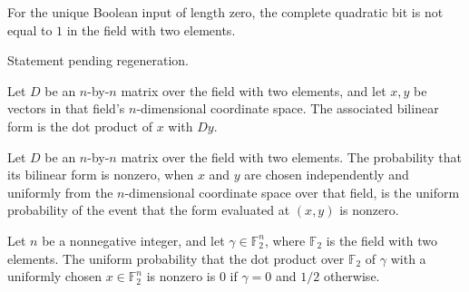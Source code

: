 \begin{theorem}
\label{FABL.not_isCompleteQuadraticOne_zero}
\leanok
{}
For the unique Boolean input of length zero, the complete quadratic bit is not equal to
$1$ in the field with two elements.
\end{theorem}

\begin{theorem}
\label{FABL.completeQuadraticLinearPCPPDescription_or_zero}
\leanok
{}
Statement pending regeneration.
\end{theorem}

\begin{definition}
\label{FABL.matrixBilinearForm}
\leanok
{}
Let $D$ be an $n$-by-$n$ matrix over the field with two elements, and let $x,y$ be
vectors in that field's $n$-dimensional coordinate space. The associated bilinear form
is the dot product of $x$ with $Dy$.
\end{definition}

\begin{definition}
\label{FABL.matrixBilinearNonzeroProbability}
\leanok
{}
Let $D$ be an $n$-by-$n$ matrix over the field with two elements. The probability that
its bilinear form is nonzero, when $x$ and $y$ are chosen independently and uniformly
from the $n$-dimensional coordinate space over that field, is the uniform probability of
the event that the form evaluated at $(x,y)$ is nonzero.
\end{definition}

\begin{theorem}
\leanok
{}
Let $n$ be a nonnegative integer, and let $\gamma\in\mathbb{F}_2^n$, where
$\mathbb{F}_2$ is the field with two elements. The uniform probability that the dot
product over $\mathbb{F}_2$ of $\gamma$ with a uniformly chosen $x\in\mathbb{F}_2^n$
is nonzero is $0$ if $\gamma=0$ and $1/2$ otherwise.
\end{theorem}

